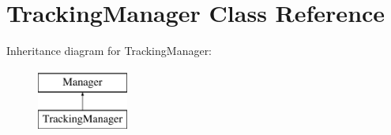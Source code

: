 \hypertarget{class_tracking_manager}{\section{Tracking\+Manager Class Reference}
\label{class_tracking_manager}
}
Inheritance diagram for Tracking\+Manager\+:\begin{figure}[H]
\begin{center}
\leavevmode
\includegraphics[height=2.000000cm]{class_tracking_manager}
\end{center}
\end{figure}
